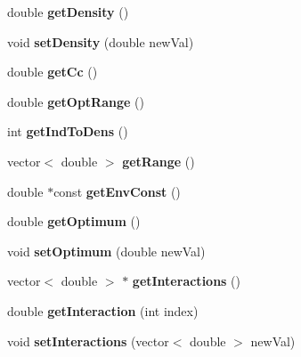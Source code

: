 \begin{DoxyCompactItemize}
\hypertarget{classSpecies_acb9612a527b867219571604e06a9b96a}{}\label{classSpecies_acb9612a527b867219571604e06a9b96a} 
double {\bfseries get\+Density} ()
\item 
\hypertarget{classSpecies_a638225fa251d88eb8fefe25575791df9}{}\label{classSpecies_a638225fa251d88eb8fefe25575791df9} 
void {\bfseries set\+Density} (double new\+Val)
\item 
\hypertarget{classSpecies_abe2828fd01669eac6359b1fb30d02f96}{}\label{classSpecies_abe2828fd01669eac6359b1fb30d02f96} 
double {\bfseries get\+Cc} ()
\item 
\hypertarget{classSpecies_a5f2ab7671a625cc25bbfee399b4a388a}{}\label{classSpecies_a5f2ab7671a625cc25bbfee399b4a388a} 
double {\bfseries get\+Opt\+Range} ()
\item 
\hypertarget{classSpecies_aa7f142ce10d699c3e222aed1e9527153}{}\label{classSpecies_aa7f142ce10d699c3e222aed1e9527153} 
int {\bfseries get\+Ind\+To\+Dens} ()
\item 
\hypertarget{classSpecies_a972f259afd0683125f29ab396afe7b90}{}\label{classSpecies_a972f259afd0683125f29ab396afe7b90} 
vector$<$ double $>$ {\bfseries get\+Range} ()
\item 
\hypertarget{classSpecies_abf5450485f6027d93c969cf5aa310239}{}\label{classSpecies_abf5450485f6027d93c969cf5aa310239} 
double $\ast$const {\bfseries get\+Env\+Const} ()
\item 
\hypertarget{classSpecies_a77083a8913e501f92abfdfdc0b376249}{}\label{classSpecies_a77083a8913e501f92abfdfdc0b376249} 
double {\bfseries get\+Optimum} ()
\item 
\hypertarget{classSpecies_ad800e8f89d4ea0b68644d58ba4796d88}{}\label{classSpecies_ad800e8f89d4ea0b68644d58ba4796d88} 
void {\bfseries set\+Optimum} (double new\+Val)
\item 
\hypertarget{classSpecies_a0f1fb546bb844fbeb9486888bddfd666}{}\label{classSpecies_a0f1fb546bb844fbeb9486888bddfd666} 
vector$<$ double $>$ $\ast$ {\bfseries get\+Interactions} ()
\item 
\hypertarget{classSpecies_a13bd812c3a366cf4a3bf9bd3e1e4d3fa}{}\label{classSpecies_a13bd812c3a366cf4a3bf9bd3e1e4d3fa} 
double {\bfseries get\+Interaction} (int index)
\item 
\hypertarget{classSpecies_a3cf0a84408e2e0e6981654dc4a9f4eeb}{}\label{classSpecies_a3cf0a84408e2e0e6981654dc4a9f4eeb} 
void {\bfseries set\+Interactions} (vector$<$ double $>$ new\+Val)
\item 
\hypertarget{classSpecies_a2158c22a9098d6591c829fb54611fc03}{}\label{classSpecies_a2158c22a9098d6591c829fb54611fc03} 

\end{DoxyCompactItemize}
